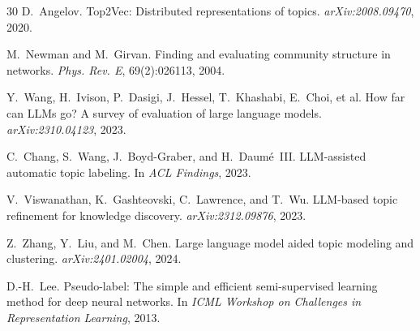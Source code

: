 \documentclass[10pt,twocolumn,twoside]{article}
\begin{document}
\begin{thebibliography}{30}
D.~Angelov.
Top2Vec: Distributed representations of topics.
\textit{arXiv:2008.09470}, 2020.

M.~Newman and M.~Girvan.
Finding and evaluating community structure in networks.
\textit{Phys. Rev. E}, 69(2):026113, 2004.

Y.~Wang, H.~Ivison, P.~Dasigi, J.~Hessel, T.~Khashabi, E.~Choi, et al.
How far can LLMs go? A survey of evaluation of large language models.
\textit{arXiv:2310.04123}, 2023.

C.~Chang, S.~Wang, J.~Boyd-Graber, and H.~Daum\'{e}~III.
LLM-assisted automatic topic labeling.
In \textit{ACL Findings}, 2023.

V.~Viswanathan, K.~Gashteovski, C.~Lawrence, and T.~Wu.
LLM-based topic refinement for knowledge discovery.
\textit{arXiv:2312.09876}, 2023.

Z.~Zhang, Y.~Liu, and M.~Chen.
Large language model aided topic modeling and clustering.
\textit{arXiv:2401.02004}, 2024.

D.-H.~Lee.
Pseudo-label: The simple and efficient semi-supervised learning method for deep neural networks.
In \textit{ICML Workshop on Challenges in Representation Learning}, 2013.

\end{thebibliography}
\end{document}
